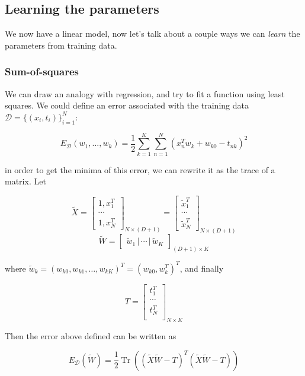 \documentclass{report}
\DeclareMathOperator{\Tr}{Tr}
\begin{document}
\subsection{Learning the parameters}

We now have a linear model, now let's talk about a couple ways we can \textit{learn} the parameters from training data.

\subsubsection{Sum-of-squares}

We can draw an analogy with regression, and try to fit a function using least squares. We could define an error associated with the training data $\mathcal{D} = \{(x_i, t_i)\}_{i=1}^N$:

\[E_\mathcal{D}(w_1,\dots,w_k) = \frac{1}{2}\sum_{k = 1}^K\sum_{n=1}^N(x_n^Tw_k + w_{k0} - t_{nk})^2\]

in order to get the minima of this error, we can rewrite it as the trace of a matrix. Let

\[\widetilde{X} = \begin{bmatrix}
	1, x_1^T\\
	\cdots\\
	1, x_N^T
\end{bmatrix}_{N\times(D+1)} = \begin{bmatrix}
	\widetilde{x}_1^T\\
	\cdots\\
	\widetilde{x}_N^T
\end{bmatrix}_{N\times(D+1)}\]
\[\widetilde{W} = \begin{bmatrix}
	\widetilde{w}_{1}\,|\,\cdots\,|\,\widetilde{w}_K
\end{bmatrix}_{(D+1)\times K}\]

where $\widetilde{w}_k = (w_{k0}, w_{k1}, \dots, w_{kK})^T = (w_{k0}, w_k^T)^T$, and finally

\[T = \begin{bmatrix}
	t_1^T\\
	\cdots\\
	t_N^T\\
\end{bmatrix}_{N\times K} \]

Then the error above defined can be written as

\[E_\mathcal{D}\left(\widetilde{W}\right) = \frac{1}{2}\Tr\left((\widetilde{X}\widetilde{W} - T)^T(\widetilde{X}\widetilde{W} - T)\right)\]
\end{document}
